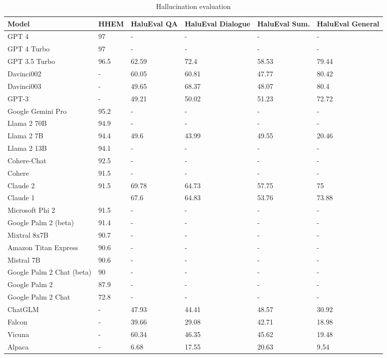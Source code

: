 \documentclass[conference]{IEEEtran}
\begin{document}
\begin{table*}[ht]
    \centering
    \caption{Hallucination evaluation} \label{tab:hallucination}
    \begin{tabular}{|l|l|l|l|l|l|}
    \hline
        Model & HHEM & HaluEval QA & HaluEval Dialogue & HaluEval Sum. & HaluEval General \\ \hline
GPT 4 & 97 & - & - & - & - \\ \hline
GPT 4 Turbo & 97 & - & - & - & - \\ \hline
GPT 3.5 Turbo & 96.5 & 62.59 & 72.4 & 58.53 & 79.44 \\ \hline
Davinci002 & - & 60.05 & 60.81 & 47.77 & 80.42 \\ \hline
Davinci003 & - & 49.65 & 68.37 & 48.07 & 80.4 \\ \hline
GPT-3 & - & 49.21 & 50.02 & 51.23 & 72.72 \\ \hline
Google Gemini Pro & 95.2 & - & - & - & - \\ \hline
Llama 2 70B & 94.9 & - & - & - & - \\ \hline
Llama 2 7B & 94.4 & 49.6 & 43.99 & 49.55 & 20.46 \\ \hline
Llama 2 13B & 94.1 & - & - & - & - \\ \hline
Cohere-Chat & 92.5 & - & - & - & - \\ \hline
Cohere & 91.5 & - & - & - & - \\ \hline
Claude 2 & 91.5 & 69.78 & 64.73 & 57.75 & 75 \\ \hline
Claude 1 & & 67.6 & 64.83 & 53.76 & 73.88 \\ \hline
Microsoft Phi 2 & 91.5 & - & - & - & - \\ \hline
Google Palm 2 (beta) & 91.4 & - & - & - & - \\ \hline
Mixtral 8x7B & 90.7 & - & - & - & - \\ \hline
Amazon Titan Express & 90.6 & - & - & - & - \\ \hline
Mistral 7B & 90.6 & - & - & - & - \\ \hline
Google Palm 2 Chat (beta) & 90 & - & - & - & - \\ \hline
Google Palm 2 & 87.9 & - & - & - & - \\ \hline
Google Palm 2 Chat & 72.8 & - & - & - & - \\ \hline
ChatGLM & - & 47.93 & 44.41 & 48.57 & 30.92 \\ \hline
Falcon & - & 39.66 & 29.08 & 42.71 & 18.98 \\ \hline
Vicuna & - & 60.34 & 46.35 & 45.62 & 19.48 \\ \hline
Alpaca & - & 6.68 & 17.55 & 20.63 & 9.54 \\ \hline
    \end{tabular}
\end{table*}
\end{document}
